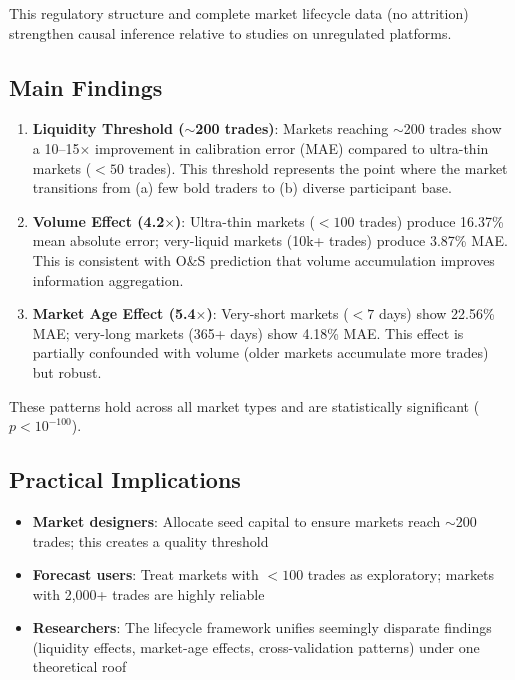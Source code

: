 \documentclass[a4paper,11pt]{article}
\theoremstyle{plain}
\theoremstyle{definition}
\begin{document}
This regulatory structure and complete market lifecycle data (no attrition) strengthen causal inference relative to studies on unregulated platforms.

\subsection{Main Findings}

\begin{enumerate}
\item \textbf{Liquidity Threshold ($\sim$200 trades)}: Markets reaching $\sim$200 trades show a 10--15$\times$ improvement in calibration error (MAE) compared to ultra-thin markets ($<50$ trades). This threshold represents the point where the market transitions from (a) few bold traders to (b) diverse participant base.

\item \textbf{Volume Effect (4.2$\times$)}: Ultra-thin markets ($<100$ trades) produce 16.37\% mean absolute error; very-liquid markets (10k+ trades) produce 3.87\% MAE. This is consistent with O\&S prediction that volume accumulation improves information aggregation.

\item \textbf{Market Age Effect (5.4$\times$)}: Very-short markets ($<7$ days) show 22.56\% MAE; very-long markets (365+ days) show 4.18\% MAE. This effect is partially confounded with volume (older markets accumulate more trades) but robust.
\end{enumerate}

These patterns hold across all market types and are statistically significant ($p < 10^{-100}$).

\subsection{Practical Implications}

\begin{itemize}
\item \textbf{Market designers}: Allocate seed capital to ensure markets reach $\sim$200 trades; this creates a quality threshold
\item \textbf{Forecast users}: Treat markets with $<100$ trades as exploratory; markets with 2,000+ trades are highly reliable
\item \textbf{Researchers}: The lifecycle framework unifies seemingly disparate findings (liquidity effects, market-age effects, cross-validation patterns) under one theoretical roof
\end{itemize}
\end{document}
